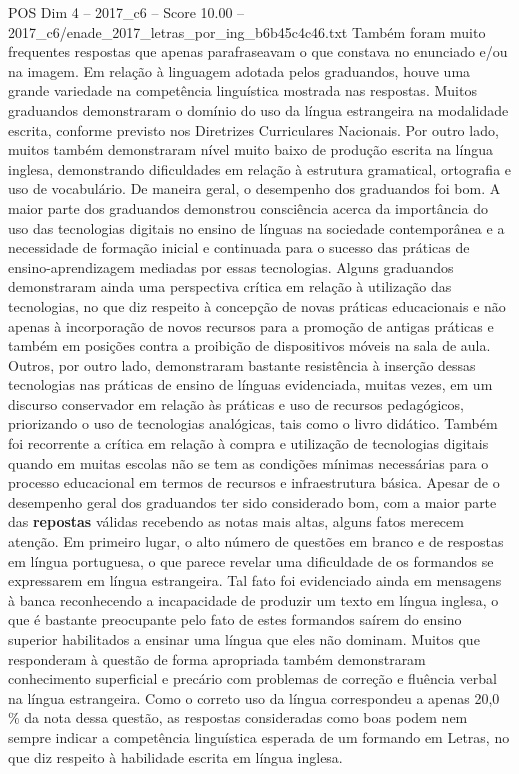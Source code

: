\begin{textsample}{POS Dim 4 – 2017\_c6 – Score 10.00 – 2017\_c6/enade\_2017\_letras\_por\_ing\_b6b45c4c46.txt}
Também foram muito frequentes respostas que apenas parafraseavam o que constava no enunciado e/ou na imagem.
Em relação à linguagem adotada pelos graduandos, houve uma grande variedade na competência linguística mostrada nas respostas.
Muitos graduandos demonstraram o domínio do uso da língua estrangeira na modalidade escrita, conforme previsto nos Diretrizes Curriculares Nacionais.
Por outro lado, muitos também demonstraram nível muito baixo de produção escrita na língua inglesa, demonstrando dificuldades em relação à estrutura gramatical, ortografia e uso de vocabulário.
De maneira geral, o desempenho dos graduandos foi bom.
A maior parte dos graduandos demonstrou consciência acerca da importância do uso das tecnologias digitais no ensino de línguas na sociedade contemporânea e a necessidade de formação inicial e continuada para o sucesso das práticas de ensino-aprendizagem mediadas por essas tecnologias.
Alguns graduandos demonstraram ainda uma perspectiva crítica em relação à utilização das tecnologias, no que diz respeito à concepção de novas práticas educacionais e não apenas à incorporação de novos recursos para a promoção de antigas práticas e também em posições contra a proibição de dispositivos móveis na sala de aula.
Outros, por outro lado, demonstraram bastante resistência à inserção dessas tecnologias nas práticas de ensino de línguas evidenciada, muitas vezes, em um discurso conservador em relação às práticas e uso de recursos pedagógicos, priorizando o uso de tecnologias analógicas, tais como o livro didático.
Também foi recorrente a crítica em relação à compra e utilização de tecnologias digitais quando em muitas escolas não se tem as condições mínimas necessárias para o processo educacional em termos de recursos e infraestrutura básica.
Apesar de o desempenho geral dos graduandos ter sido considerado bom, com a maior parte das \textbf{repostas} válidas recebendo as notas mais altas, alguns fatos merecem atenção.
Em primeiro lugar, o alto número de questões em branco e de respostas em língua portuguesa, o que parece revelar uma dificuldade de os formandos se expressarem em língua estrangeira.
Tal fato foi evidenciado ainda em mensagens à banca reconhecendo a incapacidade de produzir um texto em língua inglesa, o que é bastante preocupante pelo fato de estes formandos saírem do ensino superior habilitados a ensinar uma língua que eles não dominam.
Muitos que responderam à questão de forma apropriada também demonstraram conhecimento superficial e precário com problemas de correção e fluência verbal na língua estrangeira.
Como o correto uso da língua correspondeu a apenas 20,0 \% da nota dessa questão, as respostas consideradas como boas podem nem sempre indicar a competência linguística esperada de um formando em Letras, no que diz respeito à habilidade escrita em língua inglesa.

\end{textsample}
